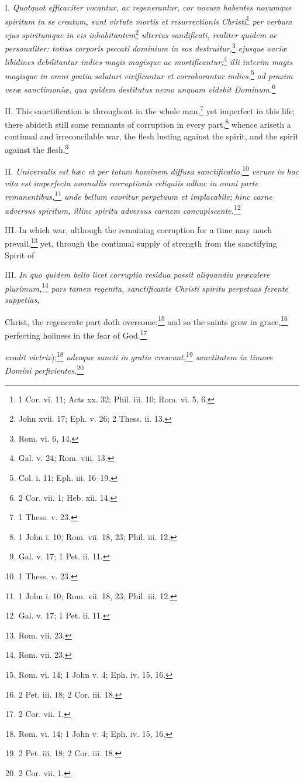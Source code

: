 I. \emph{Quotquot efficaciter vocantur, ac regenerantur, cor novum habentes novumque spiritum in se creatum, sunt virtute mortis et resurrectionis Christi}\footnote{1 Cor. vi. 11; Acts xx. 32; Phil. iii. 10; Rom. vi. 5, 6.}\emph{ per verbum ejus spiritumque in eis inhabitantem}\footnote{John xvii. 17; Eph. v. 26; 2 Thess. ii. 13.}\emph{ ulterius sandificati, realiter quidem ac personaliter: totius corporis peccati dominium in eos destruitur,}\footnote{Rom. vi. 6, 14.}\emph{ ejusque variæ libidines debilitantur indies magis magisque ac mortificantur;}\footnote{Gal. v. 24; Rom. viii. 13.}\emph{ illi interim magis magisque in omni gratia salutari vivificantur et corroborantur indies,}\footnote{Col. i. 11; Eph. iii. 16–19.}\emph{ ad praxim veræ sanctimoniæ, qua quidem destitutus nemo unquam videbit Dominum.}\footnote{2 Cor. vii. 1; Heb. xii. 14.}

II. This sanctification is throughout in the whole man,\footnote{1 Thess. v. 23.} yet imperfect in this life; there abideth still some remnants of corruption in every part,\footnote{1 John i. 10; Rom. vii. 18, 23; Phil. iii. 12.} whence ariseth a continual and irreconcilable war, the flesh lusting against the spirit, and the spirit against the flesh.\footnote{Gal. v. 17; 1 Pet. ii. 11.}

II. \emph{Universalis est hæc et per totum hominem diffusa sanctificatio,}\footnote{1 Thess. v. 23.}\emph{ verum in hac vita est imperfecta nonnullis corruptionis reliquiis adhuc in omni parte remanentibus,}\footnote{1 John i. 10; Rom. vii. 18, 23; Phil. iii. 12.}\emph{ unde bellum exoritur perpetuum et implacabile; hinc carne adversus spiritum, illinc spiritu adversus carnem concupiscente.}\footnote{Gal. v. 17; 1 Pet. ii. 11.}

III. In which war, although the remaining corruption for a time may much prevail,\footnote{Rom. vii. 23.} yet, through the continual supply of strength from the sanctifying Spirit of

III. \emph{In quo quidem bello licet corruptio residua possit aliquandiu prævalere plurimum,}\footnote{Rom. vii. 23.}\emph{ pars tamen regenita, sanctificante Christi spiritu perpetuas ferente suppetias, }

Christ, the regenerate part doth overcome;\footnote{Rom. vi. 14; 1 John v. 4; Eph. iv. 15, 16.} and so the saints grow in grace,\footnote{2 Pet. iii. 18; 2 Cor. iii. 18.} perfecting holiness in the fear of God.\footnote{2 Cor. vii. 1.}

\emph{evadit victrix});\footnote{Rom. vi. 14; 1 John v. 4; Eph. iv. 15, 16.}\emph{ adeoque sancti in gratia crescunt,}\footnote{2 Pet. iii. 18; 2 Cor. iii. 18.}\emph{ sanctitatem in timore Domini perficientes.}\footnote{2 Cor. vii. 1.}

